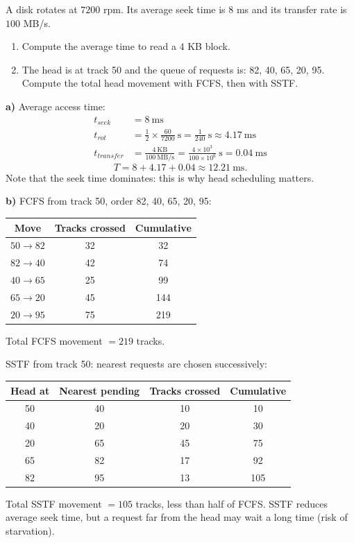 \documentclass[11pt]{article}
\newcommand{\cle}[1]{{\popxbold\color{popdark}#1}}
\begin{document}
\begin{exoresolu}
A disk rotates at $7200$ rpm. Its average seek time is $8$ ms and its transfer rate is $100$ MB/s.
\begin{enumerate}
\item[a)] Compute the average time to read a $4$ KB block.
\item[b)] The head is at track 50 and the queue of requests is: 82, 40, 65, 20, 95. Compute the total head movement with FCFS, then with SSTF.
\end{enumerate}
\tcblower
\textbf{a)} Average access time:
\begin{align*}
t_{seek} &= 8\ \text{ms}\\
t_{rot} &= \frac{1}{2}\times\frac{60}{7200}\ \text{s} = \frac{1}{240}\ \text{s} \approx 4.17\ \text{ms}\\
t_{transfer} &= \frac{4\ \text{KB}}{100\ \text{MB/s}} = \frac{4 \times 10^{3}}{100 \times 10^{6}}\ \text{s} = 0.04\ \text{ms}
\end{align*}
\[ T = 8 + 4.17 + 0.04 \approx 12.21\ \text{ms}. \]
Note that the seek time dominates: this is why head scheduling matters.

\textbf{b)} FCFS from track 50, order 82, 40, 65, 20, 95:
\begin{center}
\begin{tabular}{|c|c|c|}
\hline
\rowcolor{popblueL} \textbf{Move} & \textbf{Tracks crossed} & \textbf{Cumulative} \\
\hline
$50 \to 82$ & 32 & 32 \\
\hline
$82 \to 40$ & 42 & 74 \\
\hline
$40 \to 65$ & 25 & 99 \\
\hline
$65 \to 20$ & 45 & 144 \\
\hline
$20 \to 95$ & 75 & 219 \\
\hline
\end{tabular}
\end{center}
Total FCFS movement $= 219$ tracks.

SSTF from track 50: nearest requests are chosen successively:
\begin{center}
\begin{tabular}{|c|c|c|c|}
\hline
\rowcolor{popblueL} \textbf{Head at} & \textbf{Nearest pending} & \textbf{Tracks crossed} & \textbf{Cumulative} \\
\hline
50 & 40 & 10 & 10 \\
\hline
40 & 20 & 20 & 30 \\
\hline
20 & 65 & 45 & 75 \\
\hline
65 & 82 & 17 & 92 \\
\hline
82 & 95 & 13 & 105 \\
\hline
\end{tabular}
\end{center}
Total SSTF movement $= 105$ tracks, less than half of FCFS. SSTF reduces average seek time, but a request far from the head may wait a long time (risk of \cle{starvation}).
\end{exoresolu}
\end{document}
